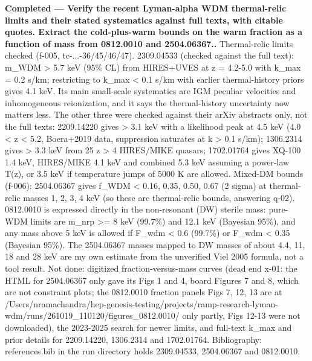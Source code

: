 \documentclass[11pt,a4paper]{article}
\begin{document}
\textbf{Completed --- Verify the recent Lyman-alpha WDM thermal-relic limits and their stated systematics against full texts, with citable quotes. Extract the cold-plus-warm bounds on the warm fraction as a function of mass from 0812.0010 and 2504.06367..} Thermal-relic limits checked (f-005, tc-...-36/45/46/47). 2309.04533 (checked against the full text): m\_WDM \textgreater{} 5.7 keV (95\% CL) from HIRES+UVES at z = 4.2-5.0 with k\_max = 0.2 s/km; restricting to k\_max \textless{} 0.1 s/km with earlier thermal-history priors gives 4.1 keV. Its main small-scale systematics are IGM peculiar velocities and inhomogeneous reionization, and it says the thermal-history uncertainty now matters less. The other three were checked against their arXiv abstracts only, not the full texts: 2209.14220 gives \textgreater{} 3.1 keV with a likelihood peak at 4.5 keV (4.0 \textless{} z \textless{} 5.2, Boera+2019 data, suppression saturates at k \textgreater{} 0.1 s/km); 1306.2314 gives \textgreater{} 3.3 keV from 25 z \textgreater{} 4 HIRES/MIKE quasars; 1702.01764 gives XQ-100 1.4 keV, HIRES/MIKE 4.1 keV and combined 5.3 keV assuming a power-law T(z), or 3.5 keV if temperature jumps of 5000 K are allowed. Mixed-DM bounds (f-006): 2504.06367 gives f\_WDM \textless{} 0.16, 0.35, 0.50, 0.67 (2 sigma) at thermal-relic masses 1, 2, 3, 4 keV (so these are thermal-relic bounds, answering q-02). 0812.0010 is expressed directly in the non-resonant (DW) sterile mass: pure-WDM limits are m\_nrp \textgreater{}= 8 keV (99.7\%) and 12.1 keV (Bayesian 95\%), and any mass above 5 keV is allowed if F\_wdm \textless{} 0.6 (99.7\%) or F\_wdm \textless{} 0.35 (Bayesian 95\%). The 2504.06367 masses mapped to DW masses of about 4.4, 11, 18 and 28 keV are my own estimate from the unverified Viel 2005 formula, not a tool result. Not done: digitized fraction-versus-mass curves (dead end x-01: the HTML for 2504.06367 only gave its Figs 1 and 4, board Figures 7 and 8, which are not constraint plots; the 0812.0010 fraction panels Figs 7, 12, 13 are at /Users/nramachandra/hep-genesis-testing/projects/ramp-research-lyman-wdm/runs/261019\_110120/figures\_0812.0010/ only partly, Figs 12-13 were not downloaded), the 2023-2025 search for newer limits, and full-text k\_max and prior details for 2209.14220, 1306.2314 and 1702.01764. Bibliography: references.bib in the run directory holds 2309.04533, 2504.06367 and 0812.0010.
\end{document}

